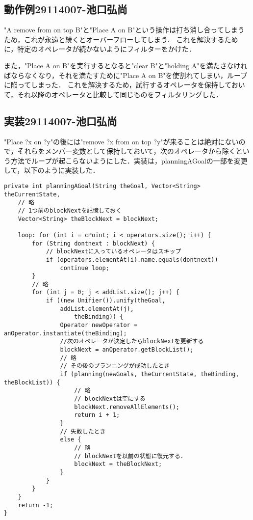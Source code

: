 \documentclass{jarticle}
\begin{document}
\subsection{動作例29114007-池口弘尚}
"A remove from on top B"と"Place A on B"という操作は打ち消し合ってしまうため，これが永遠と続くとオーバーフローしてしまう．
これを解決するために，特定のオペレータが続かないようにフィルターをかけた．

また，"Place A on B"を実行するとなると"clear B"と"holding A"を満たさなければならなくなり，それを満たすために"Place A on B"を使割れてしまい，ループに陥ってしまった．
これを解決するため，試行するオペレータを保持しておいて，それ以降のオペレータと比較して同じものをフィルタリングした．
\subsection{実装29114007-池口弘尚}
"Place ?x on ?y"の後には"remove ?x from on top ?y"が来ることは絶対にないので，それらをメンバー変数として保持しておいて，次のオペレータから除くという方法でループが起こらないようにした．実装は，planningAGoalの一部を変更して，以下のように実装した．

\begin{lstlisting}[caption=特定のオペレータが続かないようにする,label=src:blockNext]
private int planningAGoal(String theGoal, Vector<String> theCurrentState,
    // 略
    // 1つ前のblockNextを記憶しておく
    Vector<String> theBlockNext = blockNext;
    
    loop: for (int i = cPoint; i < operators.size(); i++) {
        for (String dontnext : blockNext) {
            // blockNextに入っているオペレータはスキップ
            if (operators.elementAt(i).name.equals(dontnext))
                continue loop;
        }
        // 略
        for (int j = 0; j < addList.size(); j++) {
            if ((new Unifier()).unify(theGoal,
                addList.elementAt(j),
                    theBinding)) {
                Operator newOperator = anOperator.instantiate(theBinding);
                //次のオペレータが決定したらblockNextを更新する
                blockNext = anOperator.getBlockList();
                // 略
                // その後のプランニングが成功したとき
                if (planning(newGoals, theCurrentState, theBinding, theBlockList)) {
                    // 略
                    // blockNextは空にする
                    blockNext.removeAllElements();
                    return i + 1;
                }
                // 失敗したとき
                else {
                    // 略
                    // blockNextを以前の状態に復元する．
                    blockNext = theBlockNext;
                }
            }
        }
    }
    return -1;
}
\end{lstlisting}
\end{document}
